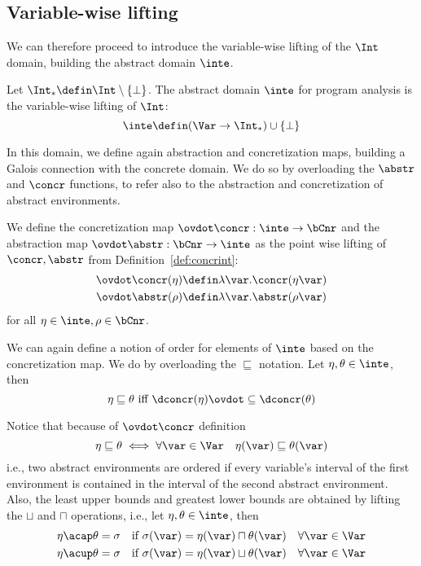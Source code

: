 \subsection{Variable-wise lifting}\label{sub:vwintervals}

We can therefore proceed to introduce the variable-wise lifting of the
\(\Int\) domain, building the abstract domain \(\inte\).

\begin{definition}
  Let \(\Int_* \defin \Int \setminus \{\bot\}\). The abstract domain
  \(\inte\) for program analysis is the variable-wise lifting of
  \(\Int\):
  \[ \inte \defin (\Var \to \Int_*) \cup \{ \bot \} \]
\end{definition}

In this domain, we define again abstraction and concretization maps,
building a Galois connection with the concrete domain. We do so by
overloading the \(\abstr\) and \(\concr\) functions, to refer also to
the abstraction and concretization of abstract environments.

\begin{definition}\label{def:vwabstr}
  We define the concretization map \(\ovdot\concr : \inte \to \bCnr\)
  and the abstraction map \(\ovdot\abstr : \bCnr \to \inte\) as the
  point wise lifting of \(\concr, \abstr\) from
  Definition~\ref{def:concrint}:
  \begin{align*}
    \ovdot\concr(\eta) & \defin \lambda \var . \concr(\eta\var) \\
    \ovdot\abstr(\rho) & \defin \lambda \var . \abstr(\rho\var)
  \end{align*}
  for all \(\eta\in\inte, \rho\in\bCnr\).
\end{definition}

We can again define a notion of order for elements of \(\inte\) based
on the concretization map. We do by overloading the 
\(\sqsubseteq\) notation. Let \(\eta, \theta \in \inte\), then
\begin{equation*}
  \eta \sqsubseteq \theta \text{ iff } \dconcr(\eta) \ovdot\subseteq \dconcr(\theta)
\end{equation*}

Notice that because of \(\ovdot\concr\) definition
\begin{equation*}
  \eta \sqsubseteq \theta \iff \forall \var \in \Var \quad \eta(\var) \sqsubseteq \theta(\var)
\end{equation*}
i.e., two abstract environments are ordered if every variable's
interval of the first environment is contained in the interval of the
second abstract environment.  Also, the least upper bounds and
greatest lower bounds are obtained by lifting the \(\sqcup\) and
\(\sqcap\) operations, i.e., let \(\eta, \theta \in \inte\), then
\begin{align*}
  \eta \acap \theta = \sigma & \quad \text{if } \sigma(\var) = \eta(\var) \sqcap \theta(\var) \quad \forall \var\in\Var \\
  \eta \acup \theta = \sigma & \quad \text{if } \sigma(\var) = \eta(\var) \sqcup \theta(\var) \quad \forall \var\in\Var
\end{align*}

